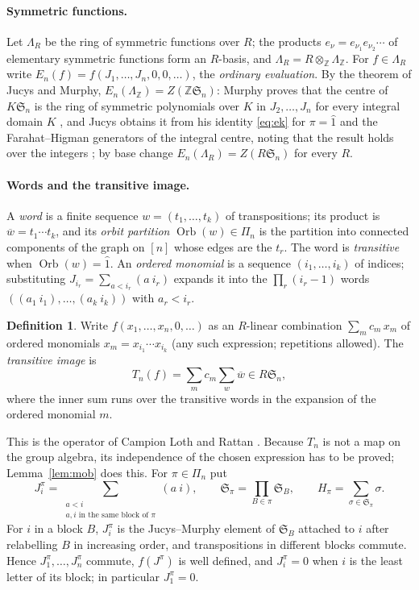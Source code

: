 \documentclass[11pt,a4paper]{article}
\theoremstyle{definition}
\newtheorem{definition}[theorem]{Definition}
\newcommand{\Sn}{\mathfrak S}
\newcommand{\Z}{\mathbb Z}
\newcommand{\Pa}{\Pi}
\DeclareMathOperator{\Orb}{Orb}
\begin{document}
\paragraph{Symmetric functions.} Let $\Lambda_R$ be the ring of symmetric functions over $R$; the products $e_\nu=e_{\nu_1}e_{\nu_2}\cdots$ of elementary symmetric functions form an $R$-basis, and $\Lambda_R=R\otimes_\Z\Lambda_\Z$. For $f\in\Lambda_R$ write $E_n(f)=f(J_1,\ldots,J_n,0,0,\ldots)$, the \emph{ordinary evaluation}. By the theorem of Jucys and Murphy, $E_n(\Lambda_\Z)=Z(\Z\Sn_n)$: Murphy proves that the centre of $K\Sn_n$ is the ring of symmetric polynomials over $K$ in $J_2,\ldots,J_n$ for every integral domain $K$ \cite[Theorem~1.9]{murphy}, and Jucys obtains it from his identity \eqref{eq:ek} for $\pi=\hat1$ and the Farahat--Higman generators of the integral centre, noting that the result holds over the integers \cite[Sections~2--3]{jucys}; by base change $E_n(\Lambda_R)=Z(R\Sn_n)$ for every $R$.

\paragraph{Words and the transitive image.} A \emph{word} is a finite sequence $w=(t_1,\ldots,t_k)$ of transpositions; its product is $\overline w=t_1\cdots t_k$, and its \emph{orbit partition} $\Orb(w)\in\Pa_n$ is the partition into connected components of the graph on $[n]$ whose edges are the $t_r$. The word is \emph{transitive} when $\Orb(w)=\hat1$. An \emph{ordered monomial} is a sequence $(i_1,\ldots,i_k)$ of indices; substituting $J_{i_r}=\sum_{a<i_r}(a\ i_r)$ expands it into the $\prod_r(i_r-1)$ words $((a_1\ i_1),\ldots,(a_k\ i_k))$ with $a_r<i_r$.

\begin{definition}\label{def:T}
Write $f(x_1,\ldots,x_n,0,\ldots)$ as an $R$-linear combination $\sum_mc_m\,x_{m}$ of ordered monomials $x_m=x_{i_1}\cdots x_{i_k}$ (any such expression; repetitions allowed). The \emph{transitive image} is
\[
 T_n(f)=\sum_mc_m\sum_{w}\overline w\in R\Sn_n,
\]
where the inner sum runs over the transitive words in the expansion of the ordered monomial $m$.
\end{definition}

This is the operator of Campion Loth and Rattan \cite[Section~1.3]{clr}. Because $T_n$ is not a map on the group algebra, its independence of the chosen expression has to be proved; Lemma~\ref{lem:mob} does this. For $\pi\in\Pa_n$ put
\[
 J_i^\pi=\sum_{\substack{a<i\\ a,i\text{ in the same block of }\pi}}(a\ i),\qquad
 \Sn_\pi=\prod_{B\in\pi}\Sn_B,\qquad H_\pi=\sum_{\sigma\in\Sn_\pi}\sigma .
\]
For $i$ in a block $B$, $J^\pi_i$ is the Jucys--Murphy element of $\Sn_B$ attached to $i$ after relabelling $B$ in increasing order, and transpositions in different blocks commute. Hence $J_1^\pi,\ldots,J_n^\pi$ commute, $f(J^\pi)$ is well defined, and $J^\pi_i=0$ when $i$ is the least letter of its block; in particular $J^\pi_1=0$.
\end{document}
